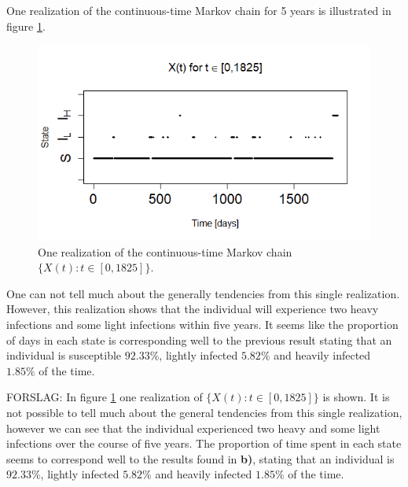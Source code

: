 One realization of the continuous-time Markov chain for 5 years is illustrated in figure \ref{1realiz5yr}.
\begin{figure}
    \centering
    \includegraphics[width=130mm]{1real5yr.png}
    \caption{One realization of the continuous-time Markov chain $\{X(t):t \in [0, 1825]\}$.}
    \label{1realiz5yr}
\end{figure}
One can not tell much about the generally tendencies from this single realization. However, this realization shows that the individual will experience two heavy infections and some light infections within five years. It seems like the proportion of days in each state is corresponding well to the previous result stating that an individual is susceptible $92.33\%$, lightly infected $5.82\%$ and heavily infected $1.85\%$ of the time. 


FORSLAG: In figure \ref{1realiz5yr} one realization of $\{X(t): t \in [0,1825]\}$ is shown. It is not possible to tell much about the general tendencies from this single realization, however we can see that the individual experienced two heavy and some light infections over the course of five years. The proportion of time spent in each state seems to correspond well to the results found in \textbf{b)}, stating that an individual is  $92.33\%$, lightly infected $5.82\%$ and heavily infected $1.85\%$ of the time. 

